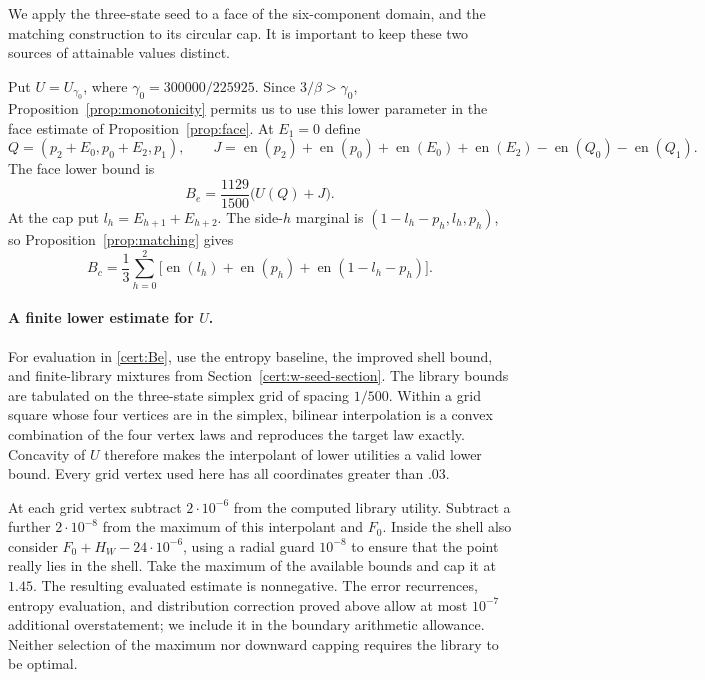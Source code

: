 \documentclass[11pt]{article}
\numberwithin{equation}{section}
\theoremstyle{definition}
\theoremstyle{remark}
\DeclareMathOperator{\en}{en}
\begin{document}
We apply the three-state seed to a face of the six-component domain, and
the matching construction to its circular cap.  It is important to keep
these two sources of attainable values distinct.

Put $U=U_{\gamma_0}$, where $\gamma_0=300000/225925$.  Since
$3/\beta>\gamma_0$, Proposition~\ref{prop:monotonicity} permits us to use
this lower parameter in the face estimate of Proposition~\ref{prop:face}.
At $E_1=0$ define
\begin{equation}\label{cert:face-data}
 Q=(p_2+E_0,p_0+E_2,p_1),\qquad
 J=\en(p_2)+\en(p_0)+\en(E_0)+\en(E_2)-\en(Q_0)-\en(Q_1).
\end{equation}
The face lower bound is
\begin{equation}\label{cert:Be}
 B_e=\frac{1129}{1500}\bigl(U(Q)+J\bigr).
\end{equation}
At the cap put $l_h=E_{h+1}+E_{h+2}$.  The side-$h$ marginal is
$(1-l_h-p_h,l_h,p_h)$, so Proposition~\ref{prop:matching} gives
\begin{equation}\label{cert:Bc}
 B_c=\frac13\sum_{h=0}^2
       \bigl[\en(l_h)+\en(p_h)+\en(1-l_h-p_h)\bigr].
\end{equation}

\paragraph{A finite lower estimate for $U$.}
For evaluation in \eqref{cert:Be}, use the entropy baseline, the improved
shell bound, and finite-library mixtures from
Section~\ref{cert:w-seed-section}.
The library bounds are tabulated on the three-state simplex grid of spacing
$1/500$.  Within a grid square whose four vertices are in the simplex,
bilinear interpolation is a convex combination of the four vertex laws
and reproduces the target law exactly.  Concavity of $U$ therefore makes
the interpolant of lower utilities a valid lower bound.  Every grid vertex
used here has all coordinates greater than $.03$.

At each grid vertex subtract $2\cdot10^{-6}$ from the computed library
utility.  Subtract a further $2\cdot10^{-8}$ from the maximum of this
interpolant and $F_0$.  Inside the shell also consider
$F_0+H_W-24\cdot10^{-6}$, using a radial guard $10^{-8}$ to ensure that the
point really lies in the shell.  Take the maximum of the available bounds
and cap it at $1.45$.  The resulting evaluated estimate is nonnegative.
The error recurrences, entropy evaluation, and distribution correction
proved above allow at most $10^{-7}$ additional overstatement; we include
it in the boundary arithmetic allowance.  Neither selection of the maximum
nor downward capping requires the library to be optimal.
\end{document}
